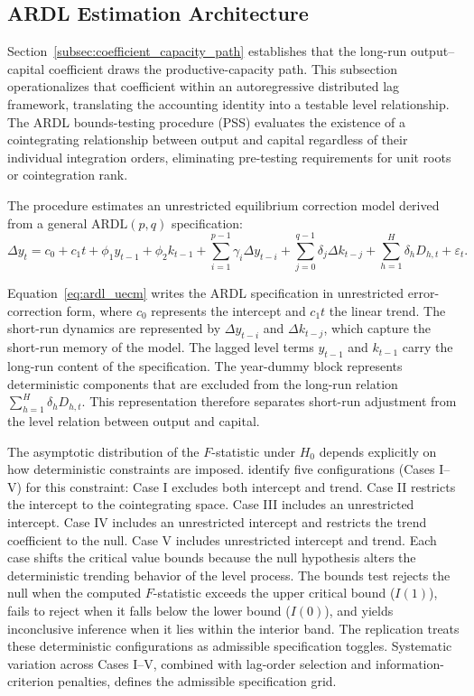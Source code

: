 \documentclass[11pt]{article}
\begin{document}
\subsection{ARDL Estimation Architecture}
\label{subsec:shaikh_identification_strategy}

Section~\ref{subsec:coefficient_capacity_path} establishes that the long-run output--capital coefficient draws the productive-capacity path. This subsection operationalizes that coefficient within an autoregressive distributed lag framework, translating the accounting identity into a testable level relationship. The ARDL bounds-testing procedure \citep{Pesaran2001} (PSS) evaluates the existence of a cointegrating relationship between output and capital regardless of their individual integration orders, eliminating pre-testing requirements for unit roots or cointegration rank.

The procedure estimates an unrestricted equilibrium correction model derived from a general $\text{ARDL}(p, q)$ specification:
\begin{equation}
\Delta y_t
= c_0 + c_1 t
+ \phi_1 y_{t-1}
+ \phi_2 k_{t-1}
+ \sum_{i=1}^{p-1} \gamma_i \Delta y_{t-i}
+ \sum_{j=0}^{q-1} \delta_j \Delta k_{t-j}
+ \sum_{h=1}^{H} \delta_h D_{h,t}
+ \varepsilon_t .
\label{eq:ardl_uecm}
\end{equation}

Equation~\eqref{eq:ardl_uecm} writes the ARDL specification in unrestricted error-correction form, where $c_0$ represents the intercept and $c_1t$ the linear trend. The short-run dynamics are represented by $\Delta y_{t-i}$ and $\Delta k_{t-j}$, which capture the short-run memory of the model. The lagged level terms $y_{t-1}$ and $k_{t-1}$ carry the long-run content of the specification. The year-dummy block represents deterministic components that are excluded from the long-run relation $\sum_{h=1}^{H}\delta_h D_{h,t}$. This representation therefore separates short-run adjustment from the level relation between output and capital.

The asymptotic distribution of the $F$-statistic under $H_0$ depends explicitly on how deterministic constraints are imposed. \citet{Pesaran2001} identify five configurations (Cases I--V) for this constraint: Case I excludes both intercept and trend. Case II restricts the intercept to the cointegrating space. Case III includes an unrestricted intercept. Case IV includes an unrestricted intercept and restricts the trend coefficient to the null. Case V includes unrestricted intercept and trend. Each case shifts the critical value bounds because the null hypothesis alters the deterministic trending behavior of the level process. The bounds test rejects the null when the computed $F$-statistic exceeds the upper critical bound ($I(1)$), fails to reject when it falls below the lower bound ($I(0)$), and yields inconclusive inference when it lies within the interior band. The replication treats these deterministic configurations as admissible specification toggles. Systematic variation across Cases I--V, combined with lag-order selection and information-criterion penalties, defines the admissible specification grid.
\end{document}

